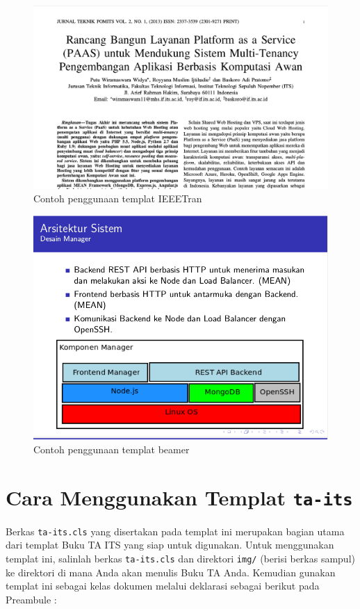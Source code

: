 \documentclass{ta-its}
\begin{document}
        \begin{figure}[h]
        	\centering
        	\includegraphics[width=\linewidth]{contoh_img/IEEETran}
        	\caption{Contoh penggunaan templat IEEETran}
        	\label{gambarIEEEtran}
        \end{figure}
        
        \begin{figure}[h]
        	\centering
        	\includegraphics[width=\linewidth]{contoh_img/beamer}
        	\caption{Contoh penggunaan templat beamer}
        	\label{gambarBeamer}
        \end{figure}

        
        \section{Cara Menggunakan Templat \texttt{ta-its}}
        Berkas \texttt{ta-its.cls} yang disertakan pada templat ini merupakan bagian utama dari templat Buku TA ITS yang siap untuk digunakan. Untuk menggunakan templat ini, salinlah berkas \texttt{ta-its.cls} dan direktori \texttt{img/} (berisi berkas sampul) ke direktori di mana Anda akan menulis Buku TA Anda. Kemudian gunakan templat ini sebagai kelas dokumen melalui deklarasi sebagai berikut pada Preambule :
        
\end{document}
